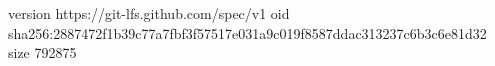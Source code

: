 version https://git-lfs.github.com/spec/v1
oid sha256:2887472f1b39c77a7fbf3f57517e031a9c019f8587ddac313237c6b3c6e81d32
size 792875
